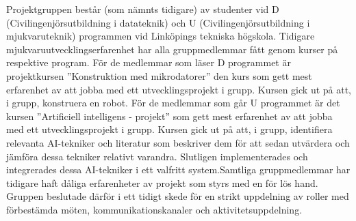 Projektgruppen består (som nämnts tidigare) av studenter vid D (Civilingenjörsutbildning i datateknik) och U (Civilingenjörsutbildning i mjukvaruteknik) programmen vid Linköpings tekniska högskola. Tidigare mjukvaruutvecklingserfarenhet har alla gruppmedlemmar fått genom kurser på respektive program. För de medlemmar som läser D programmet är projektkursen ”Konstruktion med mikrodatorer” den kurs som gett mest erfarenhet av att jobba med ett utvecklingsprojekt i grupp. Kursen gick ut på att, i grupp, konstruera en robot. För de medlemmar som går U programmet är det kursen ”Artificiell intelligens - projekt” som gett mest erfarenhet av att jobba med ett utvecklingsprojekt i grupp. Kursen gick ut på att, i grupp, identifiera relevanta AI-tekniker och literatur som beskriver dem för att sedan utvärdera och jämföra dessa tekniker relativt varandra. Slutligen implementerades och integrerades dessa AI-tekniker i ett valfritt system.Samtliga gruppmedlemmar har tidigare haft dåliga erfarenheter av projekt som styrs med en för lös hand. Gruppen beslutade därför i ett tidigt skede för en strikt uppdelning av roller med förbestämda möten, kommunikationskanaler och aktivitetsuppdelning.

